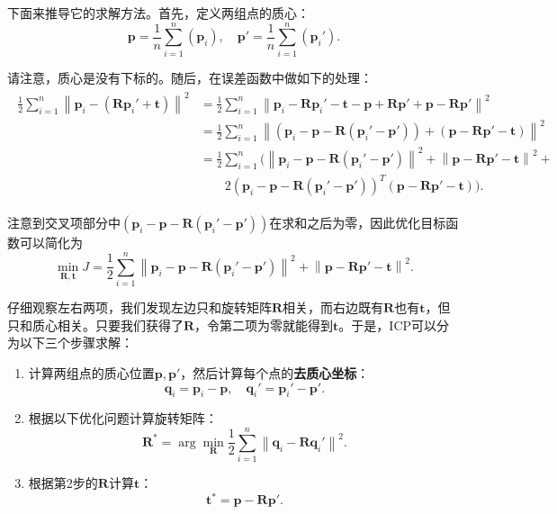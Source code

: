 下面来推导它的求解方法。首先，定义两组点的质心：
\begin{equation}
\bm{p} = \frac{1}{n}\sum_{i=1}^n ( \bm{p}_i ), \quad \bm{p}' = \frac{1}{n} \sum_{i=1}^n ( \bm{p}_i' ). 
\end{equation}

请注意，质心是没有下标的。随后，在误差函数中做如下的处理：
\begin{align*}
\begin{array}{ll}
\frac{1}{2}\sum\limits_{i = 1}^n {{{\left\| {{\bm{p}_i} - \left( {\bm{R}{ \bm{p}_i}' + \bm{t}} \right)} \right\|}^2}}  & = \frac{1}{2}\sum\limits_{i = 1}^n {{{\left\| {{\bm{p}_i} - \bm{R}{\bm{p}_i}' - \bm{t} - \bm{p} + \bm{Rp}' + \bm{p} - \bm{Rp}'} \right\|}^2}} \\
 & = \frac{1}{2}\sum\limits_{i = 1}^n {{{\left\| {\left( {{\bm{p}_i} - \bm{p} - \bm{R}\left( {{\bm{p}_i}' - \bm{p}'} \right)} \right) + \left( {\bm{p} - \bm{Rp}' - \bm{t}} \right)} \right\|}^2}} \\
& = \frac{1}{2}\sum\limits_{i = 1}^n ( {{\left\| {{\bm{p}_i} - \bm{p} - \bm{R}\left( {{\bm{p}_i}' - \bm{p}'} \right)} \right\|}^2} + {{\left\| {\bm{p} - \bm{Rp}' - \bm{t}} \right\|}^2} +\\
 & \quad \quad 2{{\left( {{\bm{p}_i} - \bm{p} - \bm{R}\left( {{\bm{p}_i}' - \bm{p}'} \right)} \right)}^T}\left( {\bm{p} - \bm{Rp}' - \bm{t}} \right)). 
\end{array}
\end{align*}

注意到交叉项部分中$\left( {{\bm{p}_i} - \bm{p} - \bm{R}\left( {{\bm{p}_i}' - \bm{p}'} \right)} \right)$在求和之后为零，因此优化目标函数可以简化为
\begin{equation}
\mathop {\min }\limits_{\bm{R}, \bm{t}} J = \frac{1}{2}\sum\limits_{i = 1}^n {{\left\| {{\bm{p}_i} - \bm{p} - \bm{R}\left( {{\bm{p}_i}' - \bm{p}'} \right)} \right\|}^2} + {{\left\| {\bm{p} - \bm{Rp}' - \bm{t}} \right\|}^2} .
\end{equation}

仔细观察左右两项，我们发现左边只和旋转矩阵$\bm{R}$相关，而右边既有$\bm{R}$也有$\bm{t}$，但只和质心相关。只要我们获得了$\bm{R}$，令第二项为零就能得到$\bm{t}$。于是，ICP可以分为以下三个步骤求解：

\begin{mdframed}
\begin{enumerate}
	\item 计算两组点的质心位置$\bm{p}, \bm{p}'$，然后计算每个点的\textbf{去质心坐标}：
	\[
	\bm{q}_i = \bm{p}_i - \bm{p}, \quad \bm{q}_i' = \bm{p}_i' - \bm{p}'.
	\]
	\item 根据以下优化问题计算旋转矩阵：
	\begin{equation}
		\bm{R}^* = \arg \mathop {\min }\limits_{\bm{R}} \frac{1}{2}\sum\limits_{i = 1}^n {{\left\| {{\bm{q}_i} - \bm{R} \bm{q}_i' } \right\|}^2}.
	\end{equation}
	\item 根据第2步的$\bm{R}$计算$\bm{t}$：
	\begin{equation}
	\label{eq:pnp-solve-t}
	\bm{t}^* = \bm{p} - \bm{R} \bm{p}'.
	\end{equation}
\end{enumerate}
\end{mdframed}
	
